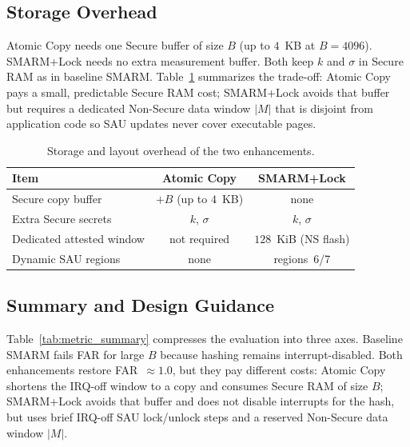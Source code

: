 \documentclass[conference]{IEEEtran}
\newcommand{\smarmlock}{SMARM+Lock\xspace}
\begin{document}
\subsection{Storage Overhead}

Atomic Copy needs one Secure buffer of size $B$ (up to $4$~KB at
$B{=}4096$).
\smarmlock{} needs no extra measurement buffer.
Both keep
$k$ and $\sigma$ in Secure RAM as in baseline SMARM.
Table~\ref{tab:storage} summarizes the trade-off: Atomic Copy pays a
small, predictable Secure RAM cost; \smarmlock{} avoids that buffer
but requires a dedicated Non-Secure data window $|M|$ that is disjoint
from application code so SAU updates never cover executable pages.

\begin{table}[!t]
  \centering
  \small
  \caption{Storage and layout overhead of the two enhancements.}
  \label{tab:storage}
  \setlength{\tabcolsep}{3.5pt}
  \begin{tabular}{lcc}
    \toprule
    \textbf{Item} & \textbf{Atomic Copy} & \textbf{\smarmlock} \\
    \midrule
    Secure copy buffer & $+B$ (up to $4$~KB) & none \\
    Extra Secure secrets & $k$, $\sigma$ & $k$, $\sigma$ \\
    Dedicated attested window & not required & $128$~KiB (NS flash) \\
    Dynamic SAU regions & none & regions~6/7 \\
    \bottomrule
  \end{tabular}
\end{table}

\subsection{Summary and Design Guidance}
\label{sec:guidance}

Table~\ref{tab:metric_summary} compresses the evaluation into three axes.
Baseline SMARM fails FAR for large $B$ because hashing remains
interrupt-disabled. Both enhancements restore FAR~$\approx 1.0$, but they
pay different costs: Atomic Copy shortens the IRQ-off window to a copy
and consumes Secure RAM of size $B$; \smarmlock{} avoids that
buffer and does not disable interrupts for the hash, but uses brief
IRQ-off SAU lock/unlock steps and a reserved Non-Secure data window
$|M|$.
\end{document}
